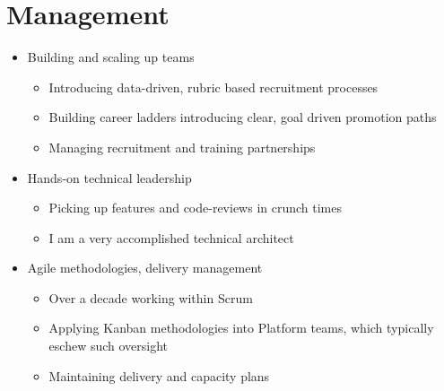 \documentclass[11pt,a4paper,sans]{article}
\begin{document}
\section{Management}

\begin{itemize}
\item Building and scaling up teams
  \begin{itemize}
  \item Introducing data-driven, rubric based recruitment processes
  \item Building career ladders introducing clear, goal driven promotion paths
  \item Managing recruitment and training partnerships
  \end{itemize}
\item Hands-on technical leadership
  \begin{itemize}
  \item Picking up features and code-reviews in crunch times
  \item I am a very accomplished technical architect
  \end{itemize}
\item Agile methodologies, delivery management
  \begin{itemize}
  \item Over a decade working within Scrum
  \item Applying Kanban methodologies into Platform teams, which typically eschew such oversight
  \item Maintaining delivery and capacity plans
  \end{itemize}
\end{itemize}






\end{document}

